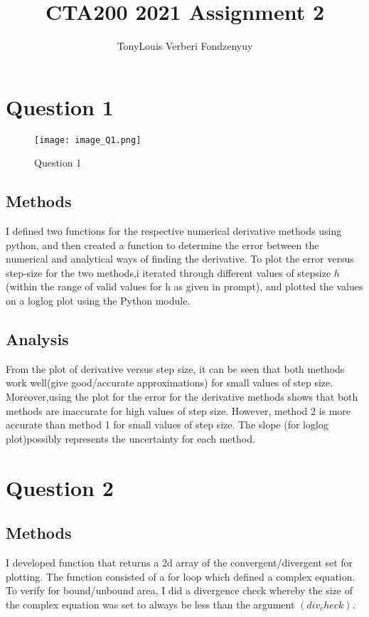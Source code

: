 \documentclass{article}
\title{CTA200 2021 Assignment 2}
\author{TonyLouis Verberi Fondzenyuy}
\date{}
\begin{document}
\maketitle

\section*{Question 1}

\begin{figure} 
  \texttt{[image: image\_Q1.png]}
  \caption{Question 1}
  
\end{figure}


\subsection*{Methods}

I defined two functions for the respective numerical derivative methods using python, and then created a function to determine the error between the numerical and analytical ways of finding the derivative. To plot the error versus step-size for the two methods,i iterated through different values of stepsize \(h\) (within the range of valid values for h as given in prompt), and plotted the values on a loglog plot using the  Python module.

\subsection*{Analysis}

From the plot of derivative versus step size, it can be seen that both methods work well(give good/accurate approximations) for small values of step size. Moreover,using the plot for the error for the derivative methods shows that both methods are inaccurate for high values of step size. However, method 2 is more accurate than method 1 for small values of step size. The slope (for loglog plot)possibly represents the uncertainty for each method.

\newpage

\section*{Question 2}

\subsection*{Methods}
I developed function that returns a 2d array of the convergent/divergent set for plotting. The function consisted of a for loop which defined a complex equation. To verify for bound/unbound area, I did a divergence check whereby the size of the complex equation was set to always be less than the argument $(div_check)$.
\end{document}
